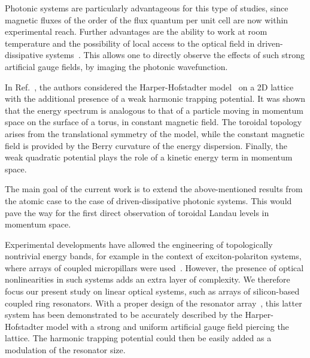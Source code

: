 \documentclass[twocolumn, 10pt, aps, superscriptaddress, floatfix, showpacs, pra, citeautoscript]{revtex4-1}
\newcommand{\co}[2]{#2}
\renewcommand{\paragraph}{\co}
\begin{document}
\paragraph{Photonic systems are a good canditate for magnetism.}
Photonic systems are particularly advantageous for this type of
studies, since magnetic fluxes of the order of the flux quantum per
unit cell are now within experimental reach. Further advantages are
the ability to work at room temperature and the possibility of local
access to the optical field in driven-dissipative
systems~\cite{carusotto2013fluids}. This allows one to directly
observe the effects of such strong artificial gauge fields, by imaging
the photonic wavefunction.

\paragraph{Momentum space dual of HH model provides new insights.}
In Ref.~, the authors considered the
Harper-Hofstadter model~\cite{hofstadter1976butterfly} on a 2D lattice
with the additional presence of a weak harmonic trapping potential. It
was shown that the energy spectrum is analogous to that of a particle
moving in momentum space on the surface of a torus, in constant
magnetic field.  The toroidal topology arises from the translational
symmetry of the model, while the constant magnetic field is provided
by the Berry curvature of the energy dispersion. Finally, the weak
quadratic potential plays the role of a kinetic energy term in
momentum space.

\paragraph{The main goal and its importance.}
The main goal of the current work is to extend the above-mentioned
results from the atomic case to the case of driven-dissipative
photonic systems. This would pave the way for the first direct
observation of toroidal Landau levels in momentum space.


\paragraph{Hafezi's arrays could be used for HH physics.}
Experimental developments have allowed the engineering of
topologically nontrivial energy bands, for example in the context of
exciton-polariton systems, where arrays of coupled micropillars were
used~\cite{jacqmin2014dirac}. However, the presence of optical
nonlinearities in such systems adds an extra layer of complexity.  We
therefore focus our present study on linear optical systems, such as
arrays of silicon-based coupled ring resonators.  With a proper design
of the resonator array~\cite{hafezi2013imaging}, this latter system
has been demonstrated to be accurately described by the
Harper-Hofstadter model with a strong and uniform artificial gauge
field piercing the lattice.  The harmonic trapping potential could
then be easily added as a modulation of the resonator size.
\end{document}
